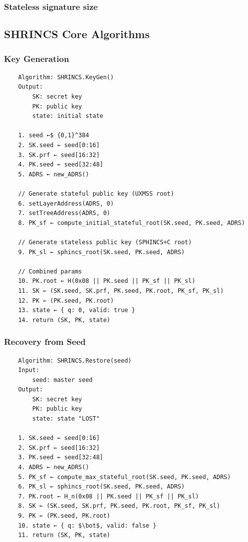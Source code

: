 \subsubsection{Stateless signature size}

\subsection{SHRINCS Core Algorithms}

\subsubsection{Key Generation}

\begin{verbatim}
    Algorithm: SHRINCS.KeyGen()
    Output:
        SK: secret key
        PK: public key  
        state: initial state

    1. seed ←$ {0,1}^384
    2. SK.seed ← seed[0:16]
    3. SK.prf ← seed[16:32]
    4. PK.seed ← seed[32:48]
    5. ADRS ← new_ADRS()

    // Generate stateful public key (UXMSS root)
    6. setLayerAddress(ADRS, 0)
    7. setTreeAddress(ADRS, 0)
    8. PK_sf ← compute_initial_stateful_root(SK.seed, PK.seed, ADRS)

    // Generate stateless public key (SPHINCS+C root)
    9. PK_sl ← sphincs_root(SK.seed, PK.seed, ADRS)

    // Combined params
    10. PK.root ← H(0x08 || PK.seed || PK_sf || PK_sl)
    11. SK ← (SK.seed, SK.prf, PK.seed, PK.root, PK_sf, PK_sl)
    12. PK ← (PK.seed, PK.root)
    13. state ← { q: 0, valid: true }
    14. return (SK, PK, state)
\end{verbatim}

\subsubsection{Recovery from Seed}

\begin{verbatim}
    Algorithm: SHRINCS.Restore(seed)
    Input:
        seed: master seed
    Output:
        SK: secret key
        PK: public key
        state: state "LOST"

    1. SK.seed ← seed[0:16]
    2. SK.prf ← seed[16:32]
    3. PK.seed ← seed[32:48]
    4. ADRS ← new_ADRS()
    5. PK_sf ← compute_max_stateful_root(SK.seed, PK.seed, ADRS)
    6. PK_sl ← sphincs_root(SK.seed, PK.seed, ADRS)
    7. PK.root ← H_n(0x08 || PK.seed || PK_sf || PK_sl)
    8. SK ← (SK.seed, SK.prf, PK.seed, PK.root, PK_sf, PK_sl)
    9. PK ← (PK.seed, PK.root)
    10. state ← { q: $\bot$, valid: false } 
    11. return (SK, PK, state)
\end{verbatim}

